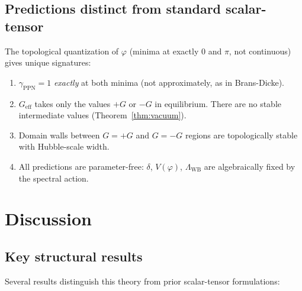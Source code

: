 \documentclass[aps,prd,twocolumn,superscriptaddress,nofootinbib]{revtex4-2}
\newcommand{\Geff}{G_{\mathrm{eff}}}
\newcommand{\Lw}{\Lambda_{\mathrm{WB}}}
\begin{document}
\subsection{Predictions distinct from standard scalar-tensor}

The topological quantization of $\varphi$
(minima at exactly $0$ and $\pi$, not continuous)
gives unique signatures:

\begin{enumerate}
\item $\gamma_{\mathrm{PPN}} = 1$ \emph{exactly} at both minima
  (not approximately, as in Brans-Dicke).

\item $\Geff$ takes only the values $+G$ or $-G$ in equilibrium.
  There are no stable intermediate values
  (Theorem~\ref{thm:vacuum}).

\item Domain walls between $G = +G$ and $G = -G$ regions
  are topologically stable with Hubble-scale width.

\item All predictions are parameter-free: $\delta$, $V(\varphi)$,
  $\Lw$ are algebraically fixed by the spectral action.
\end{enumerate}


\section{Discussion}

\subsection{Key structural results}

Several results distinguish this theory from prior scalar-tensor
formulations:
\end{document}
